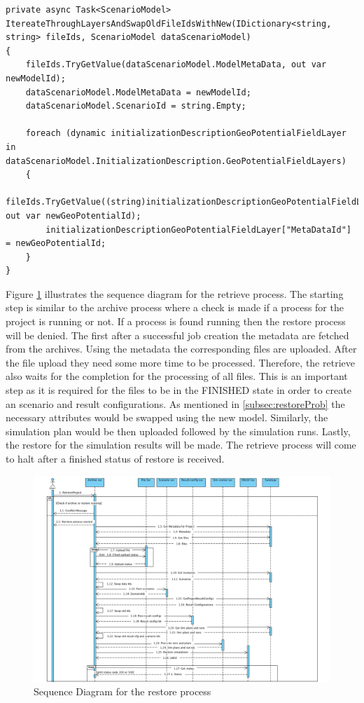 \newpage
\begin{lstlisting}[language={[Sharp]C}, caption={A method in RetrieveScenarios to swap Attributes}, captionpos=b,label={lst:swapCode}]
private async Task<ScenarioModel> ItereateThroughLayersAndSwapOldFileIdsWithNew(IDictionary<string, string> fileIds, ScenarioModel dataScenarioModel)
{
    fileIds.TryGetValue(dataScenarioModel.ModelMetaData, out var newModelId);
    dataScenarioModel.ModelMetaData = newModelId;
    dataScenarioModel.ScenarioId = string.Empty;
    
    foreach (dynamic initializationDescriptionGeoPotentialFieldLayer in dataScenarioModel.InitializationDescription.GeoPotentialFieldLayers)
    {
        fileIds.TryGetValue((string)initializationDescriptionGeoPotentialFieldLayer["MetaDataId"], out var newGeoPotentialId);
        initializationDescriptionGeoPotentialFieldLayer["MetaDataId"] = newGeoPotentialId;
    }
}
\end{lstlisting}

Figure \ref{fig:sequenceRestore} illustrates the sequence diagram for the retrieve process. The starting step is similar to the archive process where a
check is made if a process for the project is running or not. If a process is found running then the restore process will be denied. The first after a
successful job creation the metadata are fetched from the archives. Using the metadata the corresponding files are uploaded. After the file upload 
they need some more time to be processed. Therefore, the retrieve
also waits for the completion for the processing of all files.  This is an important step as it is required for the files to be in the FINISHED state
in order to create an scenario and result configurations.  As mentioned in
\ref{subsec:restoreProb} the necessary attributes would be swapped using the new model. Similarly, the simulation plan would be then uploaded followed
by the simulation runs. Lastly, the restore for the simulation results will be made. The retrieve process will come to halt after a finished
status of restore is received. 



\begin{figure}[H]
    \centering \includegraphics[scale=0.5, angle=90, origin=c]{grafiken/sequenceRestore.png}
    \caption{Sequence Diagram for the restore process}
    \label{fig:sequenceRestore}
\end{figure}

